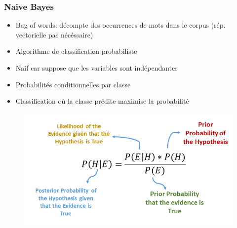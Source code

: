 \documentclass{beamer}
\begin{document}
\begin{frame}
\frametitle{Naive Bayes}
\begin{itemize}
    \item Bag of words: décompte des occurrences de mots dans le corpus (rép. vectorielle pas nécéssaire)
    \item Algorithme de classification probabiliste
    \item Naif car suppose que les variables sont indépendantes
    \item Probabilités conditionnelles par classe
    \item Classification où la classe prédite maximise la probabilité
\end{itemize}

\begin{figure}
    \begin{minipage}[b]{0.60\textwidth}
        \centering
        \includegraphics[width=\textwidth]{nb.png} 
    \end{minipage}
\end{figure}

\end{frame}
\end{document}
